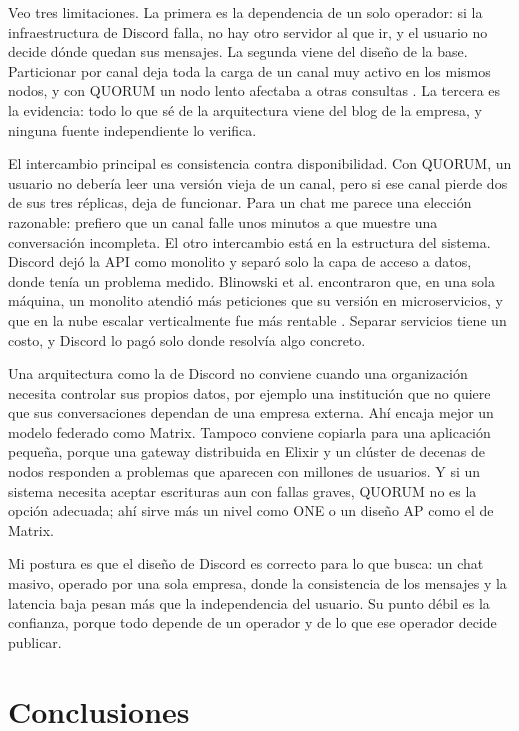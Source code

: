\documentclass[11pt,a4paper]{article}
\begin{document}
Veo tres limitaciones. La primera es la dependencia de un solo operador: si la infraestructura de Discord falla, no hay otro servidor al que ir, y el usuario no decide dónde quedan sus mensajes. La segunda viene del diseño de la base. Particionar por canal deja toda la carga de un canal muy activo en los mismos nodos, y con QUORUM un nodo lento afectaba a otras consultas \cite{Ingram2023}. La tercera es la evidencia: todo lo que sé de la arquitectura viene del blog de la empresa, y ninguna fuente independiente lo verifica.

El intercambio principal es consistencia contra disponibilidad. Con QUORUM, un usuario no debería leer una versión vieja de un canal, pero si ese canal pierde dos de sus tres réplicas, deja de funcionar. Para un chat me parece una elección razonable: prefiero que un canal falle unos minutos a que muestre una conversación incompleta. El otro intercambio está en la estructura del sistema. Discord dejó la API como monolito y separó solo la capa de acceso a datos, donde tenía un problema medido. Blinowski et al. encontraron que, en una sola máquina, un monolito atendió más peticiones que su versión en microservicios, y que en la nube escalar verticalmente fue más rentable \cite{Blinowski2022}. Separar servicios tiene un costo, y Discord lo pagó solo donde resolvía algo concreto.

Una arquitectura como la de Discord no conviene cuando una organización necesita controlar sus propios datos, por ejemplo una institución que no quiere que sus conversaciones dependan de una empresa externa. Ahí encaja mejor un modelo federado como Matrix. Tampoco conviene copiarla para una aplicación pequeña, porque una gateway distribuida en Elixir y un clúster de decenas de nodos responden a problemas que aparecen con millones de usuarios. Y si un sistema necesita aceptar escrituras aun con fallas graves, QUORUM no es la opción adecuada; ahí sirve más un nivel como ONE o un diseño AP como el de Matrix.

Mi postura es que el diseño de Discord es correcto para lo que busca: un chat masivo, operado por una sola empresa, donde la consistencia de los mensajes y la latencia baja pesan más que la independencia del usuario. Su punto débil es la confianza, porque todo depende de un operador y de lo que ese operador decide publicar.

\section{Conclusiones}\label{sec:conclusiones}
\end{document}
